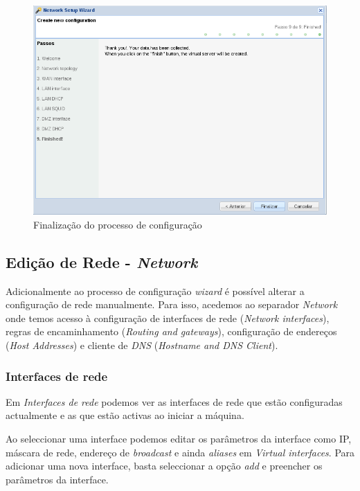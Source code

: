 \begin{figure}[H]
    \begin{center}
    \includegraphics[scale=0.38]{screenshots/etfw/etfw_wizard_09.png}
    \caption{Finalização do processo de configuração}
    \label{fig:etfw_wizard_passo9}
    \end{center}
\end{figure}

\subsection{Edição de Rede - \textit{Network}}

Adicionalmente ao processo de configuração \textit{wizard} é possível alterar a configuração de rede manualmente.
Para isso, acedemos ao separador \textit{Network} onde temos acesso à configuração de interfaces de rede (\textit{Network interfaces}), regras de encaminhamento (\textit{Routing and gateways}), configuração de endereços (\textit{Host Addresses}) e cliente de \textit{DNS} (\textit{Hostname and DNS Client}).

\subsubsection{Interfaces de rede}

Em \textit{Interfaces de rede} podemos ver as interfaces de rede que estão configuradas actualmente e as que estão activas ao iniciar a máquina.

Ao seleccionar uma interface podemos editar os parâmetros da interface como IP, máscara de rede, endereço de \textit{broadcast} e ainda \textit{aliases} em \textit{Virtual interfaces}.
Para adicionar uma nova interface, basta seleccionar a opção \textit{add} e preencher os parâmetros da interface.

